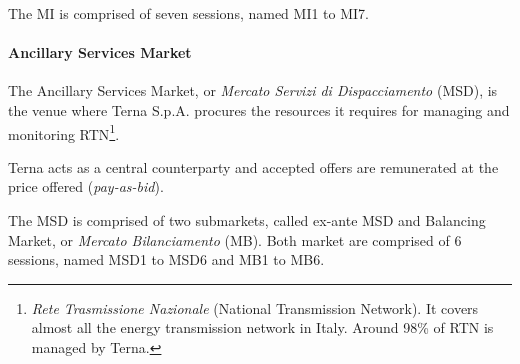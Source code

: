     The MI is comprised of seven sessions, named MI1 to MI7.

\paragraph{Ancillary Services Market}
    The Ancillary Services Market, or \textit{Mercato Servizi di Dispacciamento} (MSD), is the venue where Terna S.p.A. procures the resources it requires for managing and monitoring RTN\footnote{
        \textit{Rete Trasmissione Nazionale} (National Transmission Network).
        It covers almost all the energy transmission network in Italy.
        Around 98\% of RTN is managed by Terna.\label{footnote:rtn}
    }.
    
    Terna acts as a central counterparty and accepted offers are remunerated at the price offered (\textit{pay-as-bid}).

    The MSD is comprised of two submarkets, called ex-ante MSD and Balancing Market, or \textit{Mercato Bilanciamento} (MB).
    Both market are comprised of 6 sessions, named MSD1 to MSD6 and MB1 to MB6.
